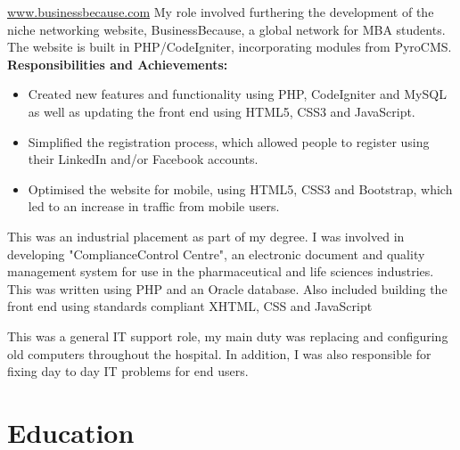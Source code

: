 \documentclass[11pt,a4paper,sans]{moderncv}
\begin{document}
{\href{www.businessbecause.com}{www.businessbecause.com} \newline{}%
My role involved furthering the development of the niche networking website, BusinessBecause, a global network for MBA students. The website is built in PHP/CodeIgniter, incorporating modules from PyroCMS.} 
\textbf{Responsibilities and Achievements:}%
\begin{itemize}%
\item Created new features and functionality using PHP, CodeIgniter and MySQL as well as updating the front end using HTML5, CSS3 and JavaScript. 
\item Simplified the registration process, which allowed people to register using their LinkedIn and/or Facebook accounts.
\item Optimised the website for mobile, using HTML5, CSS3 and Bootstrap, which led to an increase in traffic from mobile users.\\
\end{itemize}

{This was an industrial placement as part of my degree. I was involved in developing "ComplianceControl Centre", an electronic document and quality management system for use in the pharmaceutical and life sciences industries. This was written using PHP and an Oracle database. Also included building the front end using standards compliant XHTML, CSS and JavaScript \newline}


{This was a general IT support role, my main duty was replacing and configuring old computers throughout the hospital. In addition, I was also responsible for fixing day to day IT problems for end users.}

\section{Education}
\end{document}
